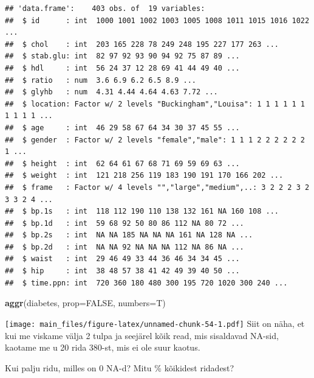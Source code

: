 \documentclass[]{book}
\newenvironment{Shaded}{\begin{snugshade}}{\end{snugshade}}
\newcommand{\KeywordTok}[1]{\textcolor[rgb]{0.13,0.29,0.53}{\textbf{#1}}}
\newcommand{\DataTypeTok}[1]{\textcolor[rgb]{0.13,0.29,0.53}{#1}}
\newcommand{\StringTok}[1]{\textcolor[rgb]{0.31,0.60,0.02}{#1}}
\newcommand{\CommentTok}[1]{\textcolor[rgb]{0.56,0.35,0.01}{\textit{#1}}}
\newcommand{\OtherTok}[1]{\textcolor[rgb]{0.56,0.35,0.01}{#1}}
\newcommand{\NormalTok}[1]{#1}
\begin{document}
\begin{verbatim}
## 'data.frame':    403 obs. of  19 variables:
##  $ id      : int  1000 1001 1002 1003 1005 1008 1011 1015 1016 1022 ...
##  $ chol    : int  203 165 228 78 249 248 195 227 177 263 ...
##  $ stab.glu: int  82 97 92 93 90 94 92 75 87 89 ...
##  $ hdl     : int  56 24 37 12 28 69 41 44 49 40 ...
##  $ ratio   : num  3.6 6.9 6.2 6.5 8.9 ...
##  $ glyhb   : num  4.31 4.44 4.64 4.63 7.72 ...
##  $ location: Factor w/ 2 levels "Buckingham","Louisa": 1 1 1 1 1 1 1 1 1 1 ...
##  $ age     : int  46 29 58 67 64 34 30 37 45 55 ...
##  $ gender  : Factor w/ 2 levels "female","male": 1 1 1 2 2 2 2 2 2 1 ...
##  $ height  : int  62 64 61 67 68 71 69 59 69 63 ...
##  $ weight  : int  121 218 256 119 183 190 191 170 166 202 ...
##  $ frame   : Factor w/ 4 levels "","large","medium",..: 3 2 2 2 3 2 3 3 2 4 ...
##  $ bp.1s   : int  118 112 190 110 138 132 161 NA 160 108 ...
##  $ bp.1d   : int  59 68 92 50 80 86 112 NA 80 72 ...
##  $ bp.2s   : int  NA NA 185 NA NA NA 161 NA 128 NA ...
##  $ bp.2d   : int  NA NA 92 NA NA NA 112 NA 86 NA ...
##  $ waist   : int  29 46 49 33 44 36 46 34 34 45 ...
##  $ hip     : int  38 48 57 38 41 42 49 39 40 50 ...
##  $ time.ppn: int  720 360 180 480 300 195 720 1020 300 240 ...
\end{verbatim}

\begin{Shaded}
\begin{Highlighting}[]
\KeywordTok{aggr}\NormalTok{(diabetes, }\DataTypeTok{prop=}\OtherTok{FALSE}\NormalTok{, }\DataTypeTok{numbers=}\NormalTok{T)}
\end{Highlighting}
\end{Shaded}

\texttt{[image: main\_files/figure-latex/unnamed-chunk-54-1.pdf]} Siit on
näha, et kui me viskame välja 2 tulpa ja seejärel kõik read, mis
sisaldavad NA-sid, kaotame me u 20 rida 380-st, mis ei ole suur kaotus.

Kui palju ridu, milles on 0 NA-d? Mitu \% kõikidest ridadest?

\begin{Shaded}
\end{Shaded}
\end{document}
